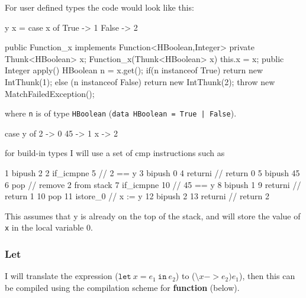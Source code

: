 \documentclass[12pt,a4paper,twoside]{article}
\begin{document}
For user defined types the code would look like this:
\begin{HaskellLst}
y x = case x of
  True  -> 1
  False -> 2
\end{HaskellLst}
\begin{JavaLst}
public Function_x implements Function<HBoolean,Integer> {
  private Thunk<HBoolean> x;
  Function_x(Thunk<HBoolean> x) {this.x = x;}
  public Integer apply() {
    HBoolean n = x.get();
    if(n instanceof True) {
      return new IntThunk(1);
    } else (n instanceof False) {
      return new IntThunk(2);
    }
    throw new MatchFailedException();
  }
}
\end{JavaLst}
where \texttt{n} is of type \texttt{HBoolean} (\texttt{data HBoolean = True | False}).
\begin{HaskellLst}
case y of
  2  -> 0
  45 -> 1
  x  -> 2
\end{HaskellLst}
for build-in types I will use a set of cmp instructions such as
\begin{JVMLst}
1  bipush 2       
2  if_icmpne 5   // 2 == y
3  bipush 0      
4  returni       // return 0
5  bipush 45
6  pop           // remove 2 from stack
7  if_icmpne 10  // 45 == y
8  bipush 1    
9  returni       // return 1
10 pop
11 istore_0      // x := y
12 bipush 2      
13 returni       // return 2
\end{JVMLst}

This assumes that y is already on the top of the stack, and will store the value of \texttt{x} in the local
variable 0.

\subsubsection{Let} 

I will translate the expression ($\mathtt{let}\ x = e_1\ \mathtt{in}\ e_2$) to 
($\texttt{\textbackslash} x -> e_2)e_1$), then 
this can be compiled using the compilation scheme for \textbf{function} (below).
\end{document}

